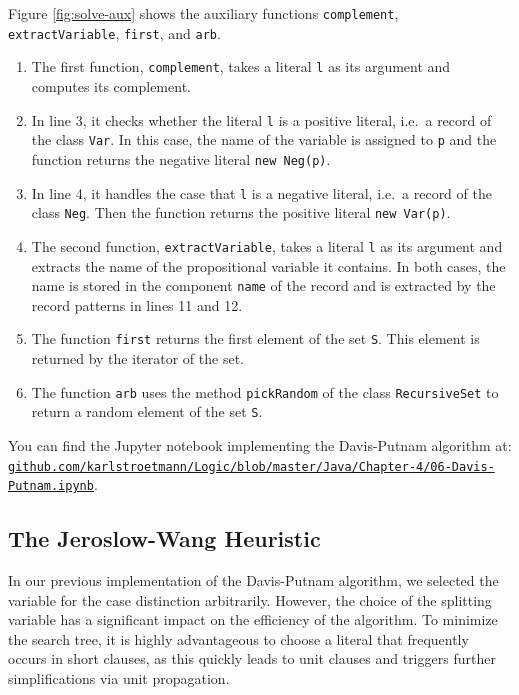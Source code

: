Figure \ref{fig:solve-aux} shows the auxiliary functions \texttt{complement},
\texttt{extractVariable}, \texttt{first}, and \texttt{arb}.
\begin{enumerate}
\item The first function, \texttt{complement}, takes a literal \texttt{l} as its argument and computes its complement.
\item In line 3, it checks whether the literal \texttt{l} is a positive literal, i.e.~a record of the class
  \texttt{Var}.  In this case, the name of the variable is assigned to \texttt{p} and the function returns the
  negative literal \texttt{new Neg(p)}.
\item In line 4, it handles the case that \texttt{l} is a negative literal, i.e.~a record of the class
  \texttt{Neg}.  Then the function returns the positive literal \texttt{new Var(p)}. 
\item The second function, \texttt{extractVariable}, takes a literal \texttt{l} as its argument and extracts
  the name of the propositional variable it contains.  In both cases, the name is stored in the component
  \texttt{name} of the record and is extracted by the record patterns in lines 11 and 12.
\item The function \texttt{first} returns the first element of the set \texttt{S}.  This element is returned
  by the iterator of the set.
\item The function \texttt{arb} uses the method \texttt{pickRandom} of the class \texttt{RecursiveSet} to return
  a random element of the set \texttt{S}.
\end{enumerate}
You can find the Jupyter notebook implementing the Davis-Putnam algorithm at:
\\[0.2cm]
\href{https://github.com/karlstroetmann/Logic/blob/master/Java/Chapter-4/06-Davis-Putnam.ipynb}{\small\texttt{github.com/karlstroetmann/Logic/blob/master/Java/Chapter-4/06-Davis-Putnam.ipynb}}.


\subsection{The Jeroslow-Wang Heuristic}
In our previous implementation of the Davis-Putnam algorithm, we selected the variable for the case distinction
arbitrarily. However, the choice of the splitting variable has a significant impact on the efficiency of the
algorithm. To minimize the search tree, it is highly advantageous to choose a literal that frequently occurs in
short clauses, as this quickly leads to unit clauses and triggers further simplifications via unit propagation. 
 

